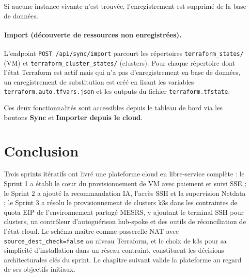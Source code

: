 Si aucune instance vivante n'est trouvée, l'enregistrement est supprimé de la
base de données.

\paragraph{Import (découverte de ressources non enregistrées).}
L'endpoint \texttt{POST /api/sync/import} parcourt les répertoires
\texttt{terraform\_states/} (VM) et \texttt{terraform\_cluster\_states/} (clusters).
Pour chaque répertoire dont l'état Terraform est actif mais qui n'a pas
d'enregistrement en base de données, un enregistrement de substitution est créé
en lisant les variables \texttt{terraform.auto.tfvars.json} et les outputs du
fichier \texttt{terraform.tfstate}.

Ces deux fonctionnalités sont accessibles depuis le tableau de bord via les boutons
\textbf{Sync} et \textbf{Importer depuis le cloud}.


\section{Conclusion}

Trois sprints itératifs ont livré une plateforme cloud en libre-service complète :
le Sprint 1 a établi le cœur du provisionnement de VM avec paiement et suivi SSE ;
le Sprint 2 a ajouté la recommandation IA, l'accès SSH et la supervision Netdata ;
le Sprint 3 a résolu le provisionnement de clusters k3s dans les contraintes de quota
EIP de l'environnement partagé MESRS, y ajoutant le terminal SSH pour clusters, un
contrôleur d'autoguérison hub-spoke et des outils de réconciliation de l'état cloud.
Le schéma maître-comme-passerelle-NAT avec \texttt{source\_dest\_check=false} au
niveau Terraform, et le choix de k3s pour sa simplicité d'installation dans un réseau
contraint, constituent les décisions architecturales clés du sprint. Le chapitre
suivant valide la plateforme au regard de ses objectifs initiaux.
